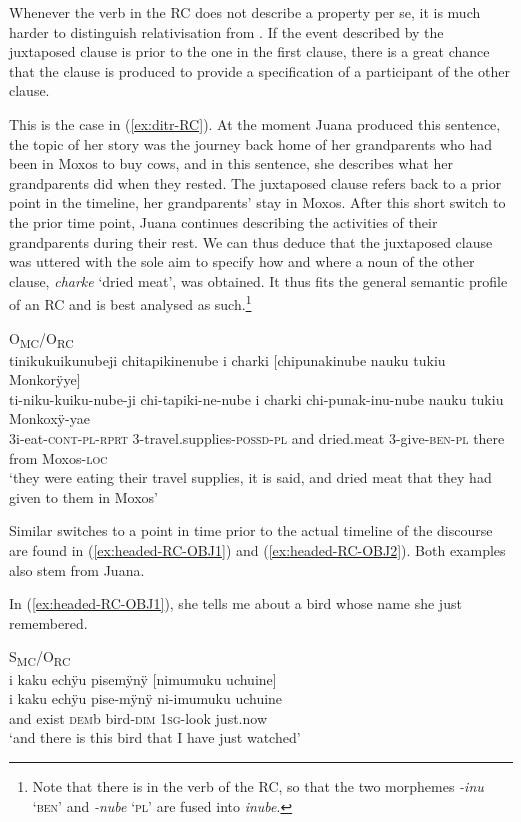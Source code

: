 Whenever the verb in the RC does not describe a property per se, it is much harder to distinguish relativisation from . If the event described by the juxtaposed clause is prior to the one in the first clause, there is a great chance that the clause is produced to provide a specification of a participant of the other clause.

This is the case in (\ref{ex:ditr-RC}). At the moment Juana produced this sentence, the topic of her story was the journey back home of her grandparents who had been in Moxos to buy cows, and in this sentence, she describes what her grandparents did when they rested. The juxtaposed clause refers back to a prior point in the timeline, her grandparents’ stay in Moxos. After this short switch to the prior time point, Juana continues describing the activities of their grandparents during their rest. We can thus deduce that the juxtaposed clause was uttered with the sole aim to specify how and where a noun of the other clause, \textit{charke} ‘dried meat’, was obtained. It thus fits the general semantic profile of an RC and is best analysed as such.\footnote{Note that there is  in the verb of the RC, so that the two morphemes \textit{-inu} ‘\textsc{ben}’ and \textit{-nube} ‘\textsc{pl}’ are fused into \textit{inube}.}

\ea\label{ex:ditr-RC}
\begingl
\glpreamble \textup{O\textsubscript{MC}/O\textsubscript{RC}}\\tinikukuikunubeji chitapikinenube i charki \textup{[}chipunakinube nauku tukiu Monkorÿye\textup{]}\\
\gla ti-niku-kuiku-nube-ji chi-tapiki-ne-nube i charki chi-punak-inu-nube nauku tukiu Monkoxÿ-yae\\
\glb 3i-eat-\textsc{cont}-\textsc{pl}-\textsc{rprt} 3-travel.supplies-\textsc{possd}-\textsc{pl} and dried.meat 3-give-\textsc{ben}-\textsc{pl} there from Moxos-\textsc{loc}\\
\glft ‘they were eating their travel supplies, it is said, and dried meat that they had given to them in Moxos’
\endgl
\trailingcitation{[jxx-p151016l-2.174]}
\xe

Similar switches to a point in time prior to the actual timeline of the discourse are found in (\ref{ex:headed-RC-OBJ1}) and (\ref{ex:headed-RC-OBJ2}). Both examples also stem from Juana.

In (\ref{ex:headed-RC-OBJ1}), she tells me about a bird whose name she just remembered.

\ea\label{ex:headed-RC-OBJ1}
\begingl
\glpreamble \textup{S\textsubscript{MC}/O\textsubscript{RC}}\\i kaku echÿu pisemÿnÿ \textup{[}nimumuku uchuine\textup{]}\\
\gla i kaku echÿu pise-mÿnÿ ni-imumuku uchuine\\
\glb and exist \textsc{dem}b bird-\textsc{dim} 1\textsc{sg}-look just.now\\
\glft ‘and there is this bird that I have just watched’
\endgl
\trailingcitation{[jxx-p120430l-1.100]}
\xe

